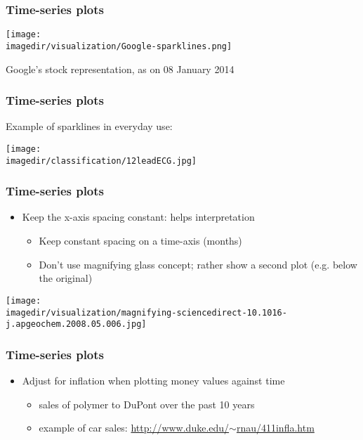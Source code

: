 \begin{frame}\frametitle{Time-series plots}
	\begin{center}
		\texttt{[image: \\imagedir/visualization/Google-sparklines.png]}
	\end{center}
	Google's stock representation, as on 08 January 2014
\end{frame}

\begin{frame}\frametitle{Time-series plots}
	Example of sparklines in everyday use:
	\begin{center}
		\texttt{[image: \\imagedir/classification/12leadECG.jpg]}
	\end{center}
\end{frame}

\begin{frame}\frametitle{Time-series plots}
	
	\begin{itemize}
		\item	Keep the x-axis spacing constant: helps interpretation 
		\begin{itemize}
			\item	Keep constant spacing on a time-axis (months)
			\item	Don't use magnifying glass concept; rather show a second plot (e.g. below the original)
		\end{itemize}
	\end{itemize}
	\begin{center}
		\texttt{[image: \\imagedir/visualization/magnifying-sciencedirect-10.1016-j.apgeochem.2008.05.006.jpg]}
	\end{center}
	\vspace{-14pt}
\end{frame}

\begin{frame}\frametitle{Time-series plots}
	\begin{itemize}
		\item	Adjust for inflation when plotting money values against time 
		\begin{itemize}
			\item	sales of polymer to DuPont over the past 10 years 
			\item	example of car sales: \href{http://www.duke.edu/~rnau/411infla.htm}{http://www.duke.edu/$\sim$rnau/411infla.htm} 
		\end{itemize}
	\end{itemize}
\end{frame}

